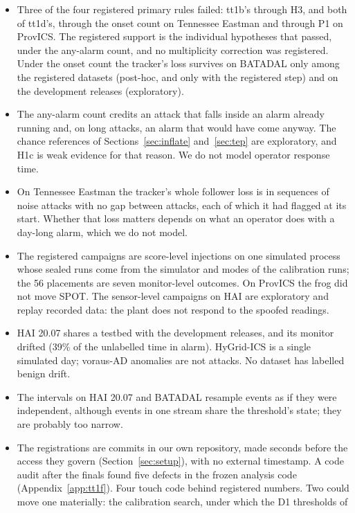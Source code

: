 \documentclass[sigconf,review,anonymous]{acmart}
\begin{document}
\begin{itemize}
\item Three of the four registered primary rules failed: tt1b's through H3, and both of tt1d's, through
  the onset count on Tennessee Eastman and through P1 on ProvICS. The registered support is the
  individual hypotheses that passed, under the any-alarm count, and no multiplicity correction was
  registered. Under the onset count the tracker's loss survives on BATADAL only among the registered
  datasets (post-hoc, and only with the registered step) and on the development releases (exploratory).
\item The any-alarm count credits an attack that falls inside an alarm already running and, on long
  attacks, an alarm that would have come anyway. The chance references of Sections~\ref{sec:inflate}
  and~\ref{sec:tep} are exploratory, and H1c is weak evidence for that reason. We do not model operator
  response time.
\item On Tennessee Eastman the tracker's whole follower loss is in sequences of noise attacks with no gap
  between attacks, each of which it had flagged at its start. Whether that loss matters depends on
  what an operator does with a day-long alarm, which we do not model.
\item The registered campaigns are score-level injections on one simulated process whose sealed runs
  come from the simulator and modes of the calibration runs; the 56 placements are seven monitor-level
  outcomes. On ProvICS the frog did not move SPOT. The sensor-level campaigns on HAI are exploratory
  and replay recorded data: the plant does not respond to the spoofed readings.
\item HAI 20.07 shares a testbed with the development releases, and its monitor drifted (39\% of the
  unlabelled time in alarm). HyGrid-ICS is a single simulated day; voraus-AD anomalies are not attacks.
  No dataset has labelled benign drift.
\item The intervals on HAI 20.07 and BATADAL resample events as if they were independent, although
  events in one stream share the threshold's state; they are probably too narrow.
\item The registrations are commits in our own repository, made seconds before the access they govern
  (Section~\ref{sec:setup}), with no external timestamp. A code audit after the finals found five
  defects in the frozen analysis code (Appendix~\ref{app:tt1f}). Four touch code behind registered
  numbers. Two could move one materially: the calibration search, under which the D1 thresholds of

\end{itemize}
\end{document}
